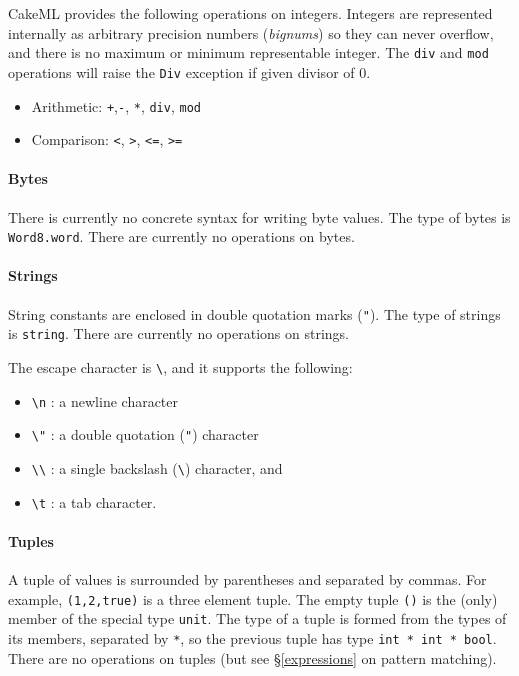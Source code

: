 \documentclass[12pt,a4paper]{book}
\begin{document}
CakeML provides the following operations on integers. Integers are represented internally as arbitrary precision numbers (\emph{bignums}) so they can never overflow, and there is no maximum or minimum representable integer. The \texttt{div} and \texttt{mod} operations will raise the \texttt{Div} exception if given divisor of 0.
\begin{itemize}
\item Arithmetic: \texttt{+},\texttt{-}, \texttt{*}, \texttt{div}, \texttt{mod}
\item Comparison: \texttt{<}, \texttt{>}, \texttt{<=}, \texttt{>=}
\end{itemize}

\paragraph{Bytes} There is currently no concrete syntax for writing byte values. The type of bytes is \texttt{Word8.word}. There are currently no operations on bytes.

\paragraph{Strings} String constants are enclosed in double quotation marks (\texttt{"}). The type of strings is \texttt{string}. There are currently no operations on strings.

The escape character is \verb|\|, and it supports the following:
\begin{itemize}
\item
\verb|\n| : a newline character
\item 
\verb|\"| : a double quotation (\texttt{"}) character
\item
\verb|\\| : a single backslash (\verb|\|) character, and
\item 
\verb|\t| : a tab character.
\end{itemize}

\paragraph{Tuples} A tuple of values is surrounded by parentheses and separated by commas. For example, \texttt{(1,2,true)} is a three element tuple. The empty tuple \texttt{()} is the (only) member of the special type \texttt{unit}. The type of a tuple is formed from the types of its members, separated by \texttt{*}, so the previous tuple has type \texttt{int * int * bool}. There are no operations on tuples (but see \S\ref{expressions} on pattern matching).
\end{document}
